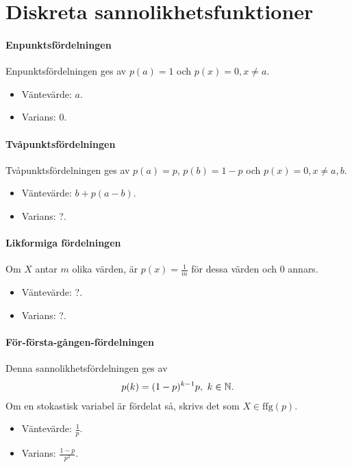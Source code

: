 \section{Diskreta sannolikhetsfunktioner}

\paragraph{Enpunktsfördelningen}
Enpunktsfördelningen ges av $p(a) = 1$ och $p(x) = 0, x\neq a$.

\begin{itemize}
	\item Väntevärde: $a$.
	\item Varians: $0$.
\end{itemize}

\paragraph{Tvåpunktsfördelningen}
Tvåpunktsfördelningen ges av $p(a) = p$, $p(b) = 1 - p$ och $p(x) = 0, x\neq a, b$.

\begin{itemize}
	\item Väntevärde: $b + p(a - b)$.
	\item Varians: ?.
\end{itemize}

\paragraph{Likformiga fördelningen}
Om $X$ antar $m$ olika värden, är $p(x) = \frac{1}{m}$ för dessa värden och $0$ annars.

\begin{itemize}
	\item Väntevärde: ?.
	\item Varians: ?.
\end{itemize}

\paragraph{För-första-gången-fördelningen}
Denna sannolikhetsfördelningen ges av
\begin{align*}
	p(k) = (1 - p)^{k - 1}p,\ k\in\mathbb{N}.
\end{align*}
Om en stokastisk variabel är fördelat så, skrivs det som $X\in\text{ffg}(p)$.

\begin{itemize}
	\item Väntevärde: $\frac{1}{p}$.
	\item Varians: $\frac{1 - p}{p^2}$.
\end{itemize}

